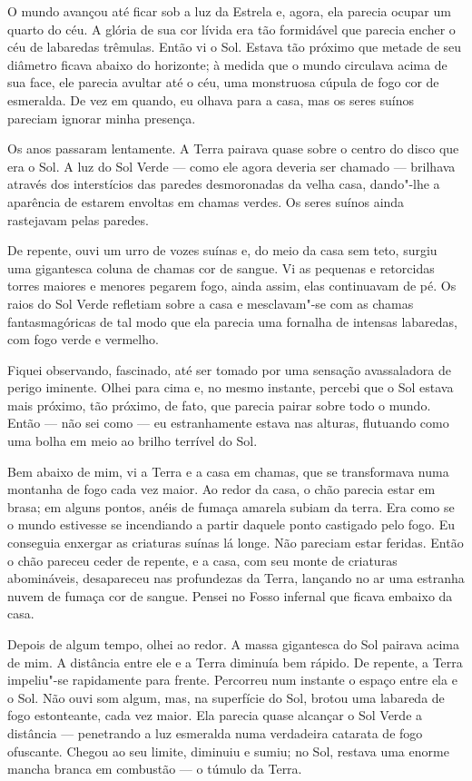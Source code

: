 O mundo avançou até ficar sob a luz da Estrela e, agora, ela parecia ocupar um quarto do céu. A glória de sua cor
lívida era tão formidável que parecia encher o céu de labaredas trêmulas. Então vi o Sol. Estava tão próximo que
metade de seu diâmetro ficava abaixo do horizonte; à medida que o mundo circulava acima de sua face, ele parecia
avultar até o céu, uma monstruosa cúpula de fogo cor de esmeralda. De vez em quando, eu olhava para a casa, mas os
seres suínos pareciam ignorar minha presença.

Os anos passaram lentamente. A Terra pairava quase sobre o centro do disco que era o Sol. A luz do Sol Verde --- como
ele agora deveria ser chamado --- brilhava através dos interstícios das paredes desmoronadas da velha casa, dando"-lhe a
aparência de estarem envoltas em chamas verdes. Os seres suínos ainda rastejavam pelas paredes.

De repente, ouvi um urro de vozes suínas e, do meio da casa sem teto, surgiu uma gigantesca coluna de chamas cor de
sangue. Vi as pequenas e retorcidas torres maiores e menores pegarem fogo, ainda assim, elas continuavam de pé. Os
raios do Sol Verde refletiam sobre a casa e mesclavam"-se com as chamas fantasmagóricas de tal modo que ela parecia uma
fornalha de intensas labaredas, com fogo verde e vermelho.

Fiquei observando, fascinado, até ser tomado por uma sensação avassaladora de perigo iminente. Olhei para cima e, no
mesmo instante, percebi que o Sol estava mais próximo, tão próximo, de fato, que parecia pairar sobre todo o mundo.
Então --- não sei como --- eu estranhamente estava nas alturas, flutuando como uma bolha em meio ao brilho terrível do Sol.

Bem abaixo de mim, vi a Terra e a casa em chamas, que se transformava numa montanha de fogo cada vez maior. Ao redor da
casa, o chão parecia estar em brasa; em alguns pontos, anéis de fumaça amarela subiam da terra. Era como se o mundo
estivesse se incendiando a partir daquele ponto castigado pelo fogo. Eu conseguia enxergar as criaturas suínas lá
longe. Não pareciam estar feridas. Então o chão pareceu ceder de repente, e a casa, com seu monte de criaturas
abomináveis, desapareceu nas profundezas da Terra, lançando no ar uma estranha nuvem de fumaça cor de sangue. Pensei no
Fosso infernal que ficava embaixo da casa.

Depois de algum tempo, olhei ao redor. A massa gigantesca do Sol pairava acima de mim. A distância entre ele e a Terra
diminuía bem rápido. De repente, a Terra impeliu"-se rapidamente para frente. Percorreu num instante o espaço entre
ela e o Sol. Não ouvi som algum, mas, na superfície do Sol, brotou uma labareda de fogo estonteante, cada vez maior.
Ela parecia quase alcançar o Sol Verde a distância --- penetrando a luz esmeralda numa verdadeira catarata de fogo
ofuscante. Chegou ao seu limite, diminuiu e sumiu; no Sol, restava uma enorme mancha branca em combustão --- o túmulo
da Terra. 


